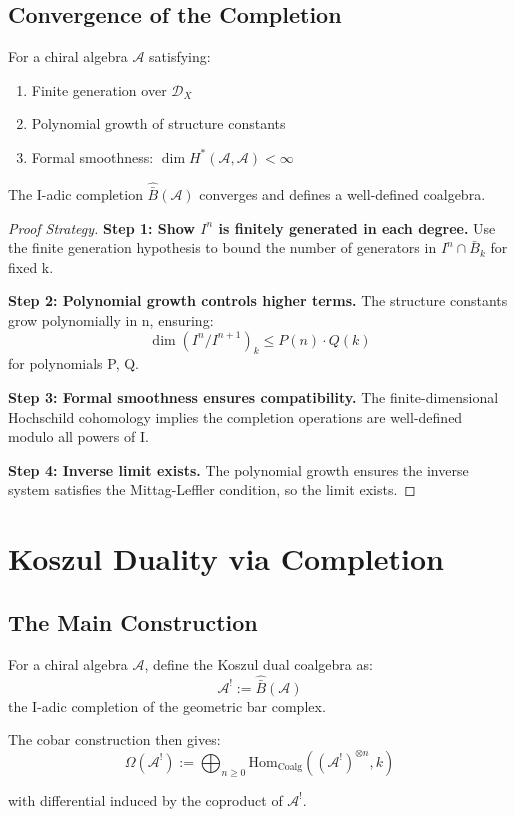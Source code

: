 \subsection{Convergence of the Completion}

\begin{theorem}\label{thm:completion-convergence}
For a chiral algebra $\mathcal{A}$ satisfying:
\begin{enumerate}
\item Finite generation over $\mathcal{D}_X$
\item Polynomial growth of structure constants
\item Formal smoothness: $\dim H^*(\mathcal{A}, \mathcal{A}) < \infty$
\end{enumerate}

The I-adic completion $\widehat{\bar{B}}(\mathcal{A})$ converges and defines a well-defined coalgebra.
\end{theorem}

\begin{proof}[Proof Strategy]
\textbf{Step 1: Show $I^n$ is finitely generated in each degree.}
Use the finite generation hypothesis to bound the number of generators in $I^n \cap \bar{B}_k$ for fixed k.

\textbf{Step 2: Polynomial growth controls higher terms.}
The structure constants grow polynomially in n, ensuring:
$$\dim(I^n/I^{n+1})_k \leq P(n) \cdot Q(k)$$
for polynomials P, Q.

\textbf{Step 3: Formal smoothness ensures compatibility.}
The finite-dimensional Hochschild cohomology implies the completion operations are well-defined modulo all powers of I.

\textbf{Step 4: Inverse limit exists.}
The polynomial growth ensures the inverse system satisfies the Mittag-Leffler condition, so the limit exists.
\end{proof}

\section{Koszul Duality via Completion}

\subsection{The Main Construction}

\begin{construction}\label{const:completed-koszul}
For a chiral algebra $\mathcal{A}$, define the Koszul dual coalgebra as:
$$\mathcal{A}^! := \widehat{\bar{B}}(\mathcal{A})$$
the I-adic completion of the geometric bar complex.

The cobar construction then gives:
$$\Omega(\mathcal{A}^!) := \bigoplus_{n \geq 0} \text{Hom}_{\text{Coalg}}((\mathcal{A}^!)^{\otimes n}, k)$$

with differential induced by the coproduct of $\mathcal{A}^!$.
\end{construction}

